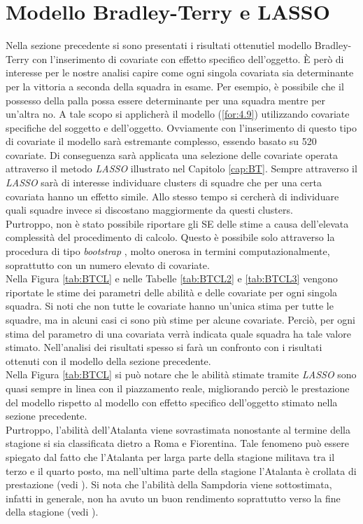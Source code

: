 \section{Modello Bradley-Terry e LASSO}
Nella sezione precedente si sono presentati i risultati ottenutiel modello Bradley-Terry con l'inserimento di covariate con effetto specifico dell'oggetto. È però di interesse per le nostre analisi capire come ogni singola covariata sia determinante per la vittoria a seconda della squadra in esame. Per esempio, è possibile che il possesso della palla possa essere determinante per una squadra mentre per un'altra no. A tale scopo si applicherà il modello (\ref{for:4.9}) utilizzando covariate specifiche del soggetto e dell'oggetto. Ovviamente con l'inserimento di questo tipo di covariate il modello sarà estremante complesso, essendo basato su 520 covariate. Di conseguenza sarà applicata una selezione delle covariate operata attraverso il metodo \emph{LASSO} illustrato nel Capitolo \ref{cap:BT}. Sempre attraverso il \emph{LASSO} sarà di interesse individuare clusters di squadre che per una certa covariata hanno un effetto simile. Allo stesso tempo si cercherà di individuare quali squadre invece si discostano maggiormente da questi clusters.\\
Purtroppo, non è stato possibile riportare gli SE delle stime a causa dell'elevata complessità del procedimento di calcolo. Questo è possibile solo attraverso la procedura di tipo \emph{bootstrap} \autocite{henderson2005bootstrap}, molto onerosa in termini computazionalmente, soprattutto con un numero elevato di covariate.\\
Nella Figura \ref{tab:BTCL} e nelle Tabelle \ref{tab:BTCL2} e \ref{tab:BTCL3} vengono riportate le stime dei parametri delle abilità e delle covariate per ogni singola squadra. Si noti che non tutte le covariate hanno un’unica stima per tutte le squadre, ma in alcuni casi ci sono più stime per alcune covariate. Perciò, per ogni stima del parametro di una covariata verrà indicata quale squadra ha tale valore stimato. Nell'analisi dei risultati spesso si farà un confronto con i risultati ottenuti con il modello della sezione precedente.\\%
Nella Figura \ref{tab:BTCL} si può notare che le abilità stimate tramite \emph{LASSO} sono quasi sempre  in linea con il piazzamento reale, migliorando perciò le prestazione del modello rispetto al modello con effetto specifico dell'oggetto stimato nella sezione precedente.\\
Purtroppo, l'abilità dell'Atalanta viene sovrastimata nonostante al termine della stagione si sia classificata dietro a Roma e Fiorentina. Tale fenomeno può essere spiegato dal fatto che l'Atalanta per larga parte della stagione militava tra il terzo e il quarto posto, ma nell'ultima parte della stagione l'Atalanta è crollata di prestazione (vedi \textit{\cite{storyAta}}). Si nota che l'abilità della Sampdoria viene sottostimata, infatti in generale, non ha avuto un buon rendimento soprattutto verso la fine della stagione (vedi \textit{\cite{storySamp}}).\\
